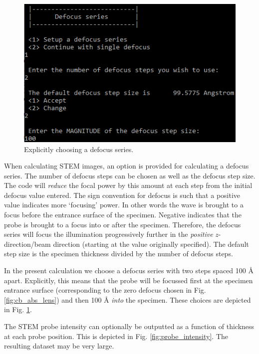 \documentclass[12pt,a4paper]{article}
\begin{document}
\begin{figure}[!h]
\begin{center}
    \includegraphics[scale=0.75]{cb_abs_defocus.png}
\caption{Explicitly choosing a defocus series.}
\label{fig:cb_abs_defocus}
\end{center}
\end{figure}

When calculating STEM images, an option is provided for calculating a defocus series.
The number of defocus steps can be chosen as well as the defocus step size.
The code will \emph{reduce} the focal power by this amount at each step from the initial defocus value entered.
The sign convention for defocus is such that a positive value indicates more `focusing' power.
In other words the wave is brought to a focus before the entrance surface of the specimen.
Negative indicates that the probe is brought to a focus into or after the specimen.  
Therefore, the defocus series will focus the illumination progressively further in the \emph{positive} $z$-direction/beam direction (starting at the value originally specified).
The default step size is the specimen thickness divided by the number of defocus steps.

In the present calculation we choose a defocus series with two steps spaced 100 \AA{} apart.
Explicitly, this means that the probe will be focussed first at the specimen entrance surface (corresponding to the zero defocus chosen in Fig. \ref{fig:cb_abs_lens}) and then 100 \AA{} \emph{into} the specimen.
These choices are depicted in Fig. \ref{fig:cb_abs_defocus}.

The STEM probe intensity can optionally be outputted as a function of thickness at each probe position.
This is depicted in Fig. \ref{fig:probe_intensity}.
The resulting dataset may be very large.
\end{document}
